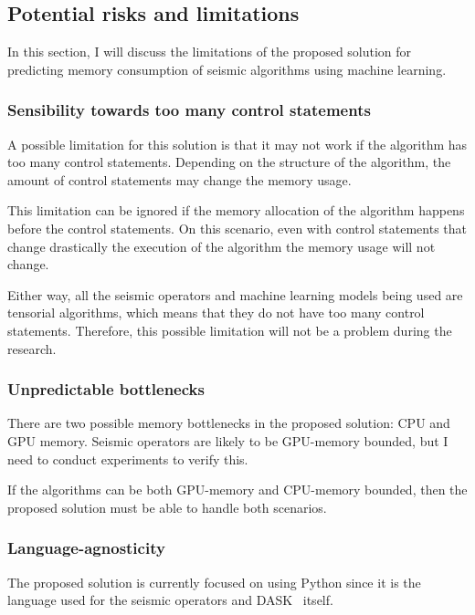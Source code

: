 \subsection{Potential risks and limitations}
\label{subsec:potential-risks-and-limitations}

In this section, I will discuss the limitations of the proposed solution for predicting memory consumption of seismic algorithms using machine learning.

\subsubsection{Sensibility towards too many control statements}

A possible limitation for this solution is that it may not work if the algorithm has too many control statements.
Depending on the structure of the algorithm, the amount of control statements may change the memory usage.

This limitation can be ignored if the memory allocation of the algorithm happens before the control statements.
On this scenario, even with control statements that change drastically the execution of the algorithm the memory usage will not change.

Either way, all the seismic operators and machine learning models being used are tensorial algorithms, which means that they do not have too many control statements.
Therefore, this possible limitation will not be a problem during the research.

\subsubsection{Unpredictable bottlenecks}

There are two possible memory bottlenecks in the proposed solution: CPU and GPU memory.
Seismic operators are likely to be GPU-memory bounded, but I need to conduct experiments to verify this.

If the algorithms can be both GPU-memory and CPU-memory bounded, then the proposed solution must be able to handle both scenarios.

\subsubsection{Language-agnosticity}

The proposed solution is currently focused on using Python since it is the language used for the seismic operators and DASK~\cite{dask} itself.

